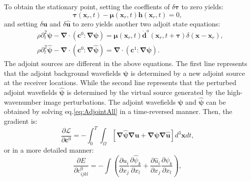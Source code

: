 \documentclass[extra,mreferee]{gji}
\newcommand{\bsy}[1]{\boldsymbol{{}#1}}
\begin{document}
To obtain the stationary point, setting the coeffients of $\delta \bsy{\tau}$ to zero yields:
\begin{equation}
	\bsy{\tau}(\mathbf{x}_r,t)-\bsy{\mu}(\mathbf{x}_r,t)\mathbf{h}(\mathbf{x}_r,t)
	=0,
        \label{eq:Adjoint1}
\end{equation}
and setting 
$\delta \mathbf{u}$
and $\delta \mathbf{\hat{u}}$ to zero yields another two adjoit state equations:  
\begin{equation}
	\begin{split}
	&\rho\partial^2_t
	\bsy\psi-\bsy{\nabla\cdot}(\bsy{\mathbf{c}}^0\bsy{:\nabla\bsy\psi})
	=\bsy{\mu}(\mathbf{x}_r,t)\mathbf{\dot{d}}^o(\mathbf{x}_r,t+\bsy{\tau})\delta(\mathbf{x}-\mathbf{x}_r),\\
	&\rho\partial^2_t \bsy{\hat \psi} -\bsy{\nabla\cdot}
	(\bsy{\mathbf{c}}^0\bsy{:\nabla\bsy{\hat
	\psi}})=\bsy{\nabla\cdot}(\bsy{\mathbf{c}}^1\bsy{:\nabla\psi}).
	\end{split}
        \label{eq:AdjointAll}
\end{equation}
The adjoint sources are different in the above equations.
The first line represents that the adjoint background wavefields $\bsy{\psi}$ is determined
by a new adjoint source at the receiver locations. While the second line represents that the perturbed adjoint wavefields
$\bsy{\hat \psi}$ is determined by the virtual source generated by the high-wavenumber image perturbations.
The adjoint wavefields $\bsy{\psi}$ and $\bsy{\hat \psi}$ can be obtained by solving eq.\eqref{eq:AdjointAll} in a time-reversed
manner. Then, the gradient
is: 
\begin{equation}
	\frac{\partial \mathcal{L}}{\partial \mathbf{c}^0}=-\int^T_0\int_{\Omega}\left[\bsy{\nabla\hat \psi} \bsy{\nabla\mathbf{u}}+
	\bsy{\nabla\psi}\bsy{\nabla\mathbf{\hat{u}}}\right]d^3\mathbf{x}dt,
\end{equation}
or in a more detailed manner:
\begin{equation}
	\frac{\partial E}{\partial c^0_{ijkl}}=-\int (\frac{\partial u_{i}}{\partial
	x_j}\frac{\partial \hat \psi_{k}}{\partial x_l}+\frac{\partial \hat{u}_{i}}{\partial
	x_j}\frac{\partial \psi_{k}}{\partial x_l}),
    \label{eq:GradientCijkl_app}
\end{equation}
\end{document}
